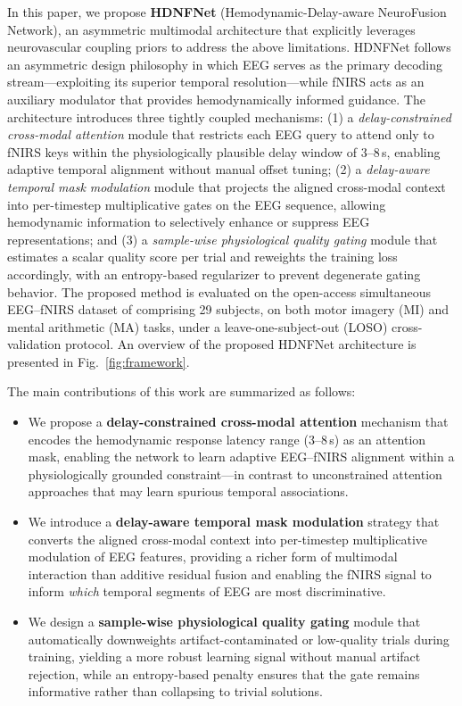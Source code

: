 \documentclass[preprint,12pt,authoryear]{elsarticle}
\begin{document}
In this paper, we propose \textbf{HDNFNet} (Hemodynamic-Delay-aware NeuroFusion Network), an asymmetric multimodal architecture that explicitly leverages neurovascular coupling priors to address the above limitations. HDNFNet follows an asymmetric design philosophy in which EEG serves as the primary decoding stream---exploiting its superior temporal resolution---while fNIRS acts as an auxiliary modulator that provides hemodynamically informed guidance. The architecture introduces three tightly coupled mechanisms: (1) a \textit{delay-constrained cross-modal attention} module that restricts each EEG query to attend only to fNIRS keys within the physiologically plausible delay window of 3--8\,s, enabling adaptive temporal alignment without manual offset tuning; (2) a \textit{delay-aware temporal mask modulation} module that projects the aligned cross-modal context into per-timestep multiplicative gates on the EEG sequence, allowing hemodynamic information to selectively enhance or suppress EEG representations; and (3) a \textit{sample-wise physiological quality gating} module that estimates a scalar quality score per trial and reweights the training loss accordingly, with an entropy-based regularizer to prevent degenerate gating behavior. The proposed method is evaluated on the open-access simultaneous EEG--fNIRS dataset of \citet{shin2016open_access} comprising 29 subjects, on both motor imagery (MI) and mental arithmetic (MA) tasks, under a leave-one-subject-out (LOSO) cross-validation protocol. An overview of the proposed HDNFNet architecture is presented in Fig.~\ref{fig:framework}.

The main contributions of this work are summarized as follows:
\begin{itemize}
    \item We propose a \textbf{delay-constrained cross-modal attention} mechanism that encodes the hemodynamic response latency range (3--8\,s) as an attention mask, enabling the network to learn adaptive EEG--fNIRS alignment within a physiologically grounded constraint---in contrast to unconstrained attention approaches that may learn spurious temporal associations.
    \item We introduce a \textbf{delay-aware temporal mask modulation} strategy that converts the aligned cross-modal context into per-timestep multiplicative modulation of EEG features, providing a richer form of multimodal interaction than additive residual fusion and enabling the fNIRS signal to inform \textit{which} temporal segments of EEG are most discriminative.
    \item We design a \textbf{sample-wise physiological quality gating} module that automatically downweights artifact-contaminated or low-quality trials during training, yielding a more robust learning signal without manual artifact rejection, while an entropy-based penalty ensures that the gate remains informative rather than collapsing to trivial solutions.
\end{itemize}
\end{document}
